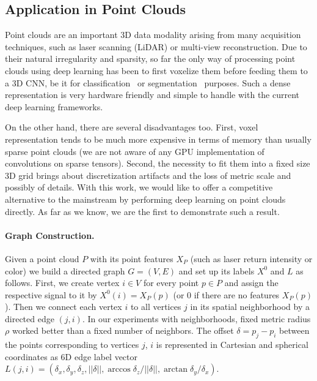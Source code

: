 \documentclass[10pt,twocolumn,letterpaper]{article}
\begin{document}
\subsection{Application in Point Clouds} \label{subsec:applclouds}

Point clouds are an important 3D data modality arising from many acquisition techniques, such as laser scanning (LiDAR) or multi-view reconstruction. Due to their natural irregularity and sparsity, so far the only way of processing point clouds using deep learning has been to first voxelize them before feeding them to a 3D CNN, be it for classification~\cite{voxnet} or segmentation~\cite{pclabeling16} purposes. Such a dense representation is very hardware friendly and simple to handle with the current deep learning frameworks.

On the other hand, there are several disadvantages too. First, voxel representation tends to be much more expensive in terms of memory than usually sparse point clouds (we are not aware of any GPU implementation of convolutions on sparse tensors). Second, the necessity to fit them into a fixed size 3D grid brings about discretization artifacts and the loss of metric scale and possibly of details. With this work, we would like to offer a competitive alternative to the mainstream by performing deep learning on point clouds directly. As far as we know, we are the first to demonstrate such a result.

\paragraph*{Graph Construction.} Given a point cloud $P$ with its point features $X_P$ (such as laser return intensity or color) we build a directed graph $G=(V,E)$ and set up its labels $X^0$ and $L$ as follows. First, we create vertex $i\in V$ for every point $p\in P$ and assign the respective signal to it by $X^0(i)=X_P(p)$ (or 0 if there are no features $X_P(p)$). Then we connect each vertex $i$ to all vertices $j$ in its spatial neighborhood by a directed edge $(j,i)$. In our experiments with neighborhoods, fixed metric radius $\rho$ worked better than a fixed number of neighbors. The offset $\delta=p_j-p_i$ between the points corresponding to vertices $j$, $i$ is represented in Cartesian and spherical coordinates as 6D edge label vector $L(j,i) = (\delta_x, \delta_y, \delta_z, ||\delta||, \arccos \delta_z/||\delta||, \arctan \delta_y/\delta_x)$.
\end{document}
